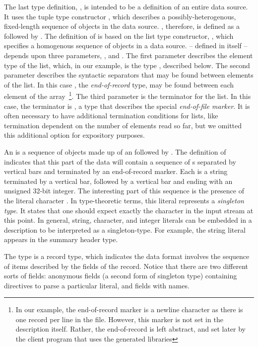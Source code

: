 The last type definition, , is intended to be a definition
of an entire \dibbler{} data source.  It uses the tuple type
constructor \cd{*}, which describes a possibly-heterogenous,
fixed-length sequence of objects in the data source. ,
therefore, is defined as a  followed by
. The definition of  is based on the list type
constructor, , which specifies a homogenous sequence of
objects in a data source.   -- defined in \padsml{} itself
-- depends upon three parameters, ,  and .
The first parameter describes the element type of the list, which, in
our example, is the type , described below. The second
parameter describes the syntactic separators that may be found between
elements of the list.  In this case , the
\emph{end-of-record} type, may be found between each element of the
array~\footnote{In our example, the end-of-record marker is a newline
  character as there is one record per line in the file.  However,
  this marker is not set in the description itself.  Rather, the
  end-of-record is left abstract, and set later by the client program
  that uses the generated libraries}. The third parameter is the
terminator for the list.  In this case, the terminator is , a
type that describes the special \emph{end-of-file marker}.  It is
often necessary to have additional termination conditions for lists,
like termination dependent on the number of elements read so far, but
we omitted this additional option for expository purposes.

An  is a sequence of objects made up of an
 followed by .  The definition of
 indicates that this part of the \dibbler{} data will
contain a sequence of s separated by vertical bars and
terminated by an end-of-record marker.  Each  is a string
terminated by a vertical bar, followed by a vertical bar and ending
with an unsigned 32-bit integer.  The interesting part of this
sequence is the presence of the literal character .  In
type-theoretic terms, this literal represents a {\em singleton type}.
It states that one should expect exactly the character  in the
input stream at this point.  In general, string, character, and
integer literals can be embedded in a description to be interpreted as
a singleton-type. For example, the string literal  appears in
the summary header type.

The type  is a record type, which indicates the data
format involves the sequence of items described by the fields of the
record.  Notice that there are two different sorts of fields:
anonymous fields (a second form of singleton type) containing
directives to parse a particular literal, and fields with names.

